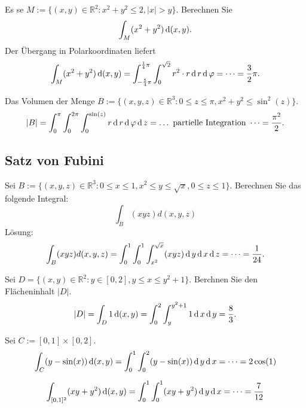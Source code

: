 \documentclass[parskip=full]{scrartcl}
\begin{document}
Es se $M := \{(x,y) \in \mathbb{R}^2 : x^2 + y^2 \leq 2, |x| > y\}$.
Berechnen Sie
\begin{displaymath}
  \int_M (x^2 + y^2) \operatorname{\mathop{}\!\mathrm{d}} (x,y).
\end{displaymath}
Der Übergang in Polarkoordinaten liefert
\begin{displaymath}
  \int_M (x^2 + y^2) \operatorname{\mathop{}\!\mathrm{d}} (x,y) = \int_{-\frac{5}{4}\pi}^{\frac{1}{4} \pi} \int_0^{\sqrt{2}} r^2 \cdot r \operatorname{\mathop{}\!\mathrm{d}} r \operatorname{\mathop{}\!\mathrm{d}} \varphi = \dots = \frac{3}{2} \pi.
\end{displaymath}

Das Volumen der Menge $B := \{(x,y,z) \in \mathbb{R}^3 : 0 \leq z \leq \pi, x^2 + y^2 \leq \sin^2(z)\}$.
\begin{displaymath}
  |B| = \int_0^{\pi} \int_0^{2\pi} \int_0^{\sin(z)} r \operatorname{\mathop{}\!\mathrm{d}} r \operatorname{\mathop{}\!\mathrm{d}} \varphi \operatorname{\mathop{}\!\mathrm{d}} z = \dots \text{ partielle Integration } \dots = \frac{\pi^2}{2}.
\end{displaymath}

\subsection{Satz von Fubini}
Sei $B := \{(x,y,z) \in \mathbb{R}^3 : 0 \leq x \leq 1, x^2 \leq y \leq \sqrt{x}, 0 \leq z \leq 1\}$.
Berechnen Sie das folgende Integral:
\begin{displaymath}
  \int_B (xyz) d(x,y,z)
\end{displaymath}
Lösung:
\begin{displaymath}
  \int_B (xyz) d(x,y,z) = \int_0^1 \int_0^1 \int_{x^2}^{\sqrt{x}} (xyz) \operatorname{\mathop{}\!\mathrm{d}} y \operatorname{\mathop{}\!\mathrm{d}} x \operatorname{\mathop{}\!\mathrm{d}} z = \dots = \frac{1}{24}.
\end{displaymath}

Sei $D = \{(x,y) \in \mathbb{R}^2 : y \in [0,2], y \leq x \leq y^2 + 1\}$.
Berchnen Sie den Flächeninhalt $|D|$.
\begin{displaymath}
  |D| = \int_D 1 \operatorname{\mathop{}\!\mathrm{d}} (x,y) = \int_0^2 \int_y^{y^2 + 1} 1 \operatorname{\mathop{}\!\mathrm{d}} x \operatorname{\mathop{}\!\mathrm{d}} y = \frac{8}{3}.
\end{displaymath}

Sei $C := [0,1] \times [0,2]$.
\begin{displaymath}
  \int_C (y - \sin(x)) \operatorname{\mathop{}\!\mathrm{d}}(x,y) = \int_0^1 \int_0^2 (y - \sin(x)) \operatorname{\mathop{}\!\mathrm{d}} y \operatorname{\mathop{}\!\mathrm{d}} x = \dots = 2 \cos(1)
\end{displaymath}

\begin{displaymath}
  \int_{[0,1]^2} (xy + y^2) \operatorname{\mathop{}\!\mathrm{d}}(x,y) = \int_0^1 \int_0^1 (xy + y^2) \operatorname{\mathop{}\!\mathrm{d}} y \operatorname{\mathop{}\!\mathrm{d}} x = \dots = \frac{7}{12}
\end{displaymath}
\end{document}
